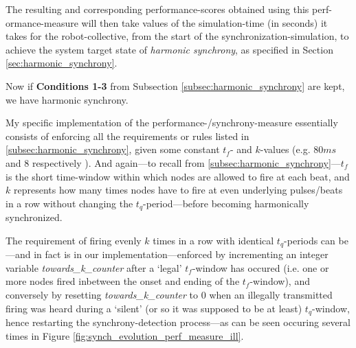 The resulting and corresponding performance-scores obtained using this perf-ormance-measure will then take values of the simulation-time (in seconds) it takes for the robot-collective, from the start of the synchronization-simulation, to achieve the system target state of \textit{harmonic synchrony}, as specified in Section \ref{sec:harmonic_synchrony}.

Now if \textbf{Conditions 1-3} from Subsection \ref{subsec:harmonic_synchrony} are kept, we have harmonic synchrony.

My specific implementation of the performance-/synchrony-measure essentially consists of enforcing all the requirements or rules listed in \ref{subsec:harmonic_synchrony}, given some constant $t_f$- and $k$-values (e.g. $80ms$ and $8$ respectively \cite{nymoen_synch}). And again—to recall from \ref{subsec:harmonic_synchrony}—$t_f$ is the short time-window within which nodes are allowed to fire at each beat, and $k$ represents how many times nodes have to fire at even underlying pulses/beats in a row without changing the $t_q$-period—before becoming harmonically synchronized.

The requirement of firing evenly $k$ times in a row with identical $t_q$-periods can be—and in fact is in our implementation—enforced by incrementing an integer variable \textit{towards\_k\_counter} after a `legal' $t_f$-window has occured (i.e. one or more nodes fired inbetween the onset and ending of the $t_f$-window), and conversely by resetting \textit{towards\_k\_counter} to 0 when an illegally transmitted firing was heard during a `silent' (or so it was supposed to be at least) $t_q$-window, hence restarting the synchrony-detection process—as can be seen occuring several times in Figure \ref{fig:synch_evolution_perf_measure_ill}.


